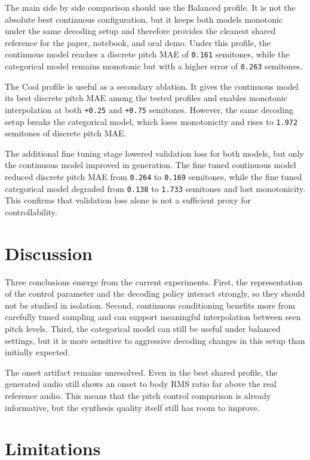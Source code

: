 \documentclass{article}
\begin{document}
The main side by side comparison should use the Balanced profile. It is not the absolute best continuous configuration, but it keeps both models monotonic under the same decoding setup and therefore provides the cleanest shared reference for the paper, notebook, and oral demo. Under this profile, the continuous model reaches a discrete pitch MAE of \texttt{0.161} semitones, while the categorical model remains monotonic but with a higher error of \texttt{0.263} semitones.

The Cool profile is useful as a secondary ablation. It gives the continuous model its best discrete pitch MAE among the tested profiles and enables monotonic interpolation at both \texttt{+0.25} and \texttt{+0.75} semitones. However, the same decoding setup breaks the categorical model, which loses monotonicity and rises to \texttt{1.972} semitones of discrete pitch MAE.

The additional fine tuning stage lowered validation loss for both models, but only the continuous model improved in generation. The fine tuned continuous model reduced discrete pitch MAE from \texttt{0.264} to \texttt{0.169} semitones, while the fine tuned categorical model degraded from \texttt{0.138} to \texttt{1.733} semitones and lost monotonicity. This confirms that validation loss alone is not a sufficient proxy for controllability.

\section{Discussion}\label{sec:discussion}

Three conclusions emerge from the current experiments. First, the representation of the control parameter and the decoding policy interact strongly, so they should not be studied in isolation. Second, continuous conditioning benefits more from carefully tuned sampling and can support meaningful interpolation between seen pitch levels. Third, the categorical model can still be useful under balanced settings, but it is more sensitive to aggressive decoding changes in this setup than initially expected.

The onset artifact remains unresolved. Even in the best shared profile, the generated audio still shows an onset to body RMS ratio far above the real reference audio. This means that the pitch control comparison is already informative, but the synthesis quality itself still has room to improve.

\section{Limitations}\label{sec:limitations}
\end{document}
